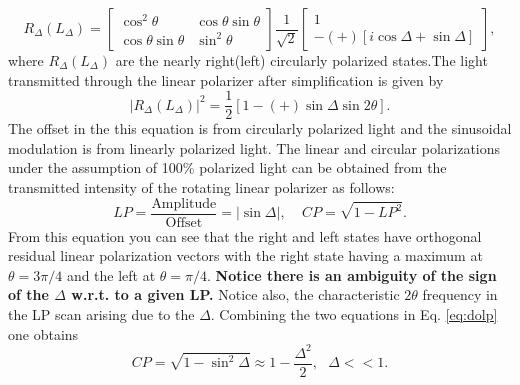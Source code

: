 \documentclass[12pt]{article}
\begin{document}
\begin{equation}
\label{eq:jones}
R_\Delta(L_\Delta)=
\begin{bmatrix}
\cos^2\theta & \cos\theta\sin\theta\\
\cos\theta\sin\theta & \sin^2\theta
\end{bmatrix}
\frac{1}{\sqrt{2}}
\begin{bmatrix}
1\\
-(+)[i\cos\Delta+\sin\Delta]
\end{bmatrix},
\end{equation}
where $R_\Delta(L_\Delta)$ are the nearly right(left) circularly polarized states.The light transmitted through the linear polarizer after simplification is given by
\begin{equation}
\left| R_\Delta(L_\Delta)\right|^2= \frac{1}{2}\left[1-(+)\sin\Delta\sin2\theta\right].
\end{equation}
The offset in the this equation is from circularly polarized light and the sinusoidal modulation is from linearly polarized light. The linear and circular polarizations under the assumption of 100\% polarized light can be obtained from the transmitted intensity of the rotating linear polarizer as follows:
\begin{equation}
\label{eq:dolp}
LP = \frac{\textrm{Amplitude}}{\textrm{Offset}}=\left|\sin\Delta\right|, ~~~~~CP = \sqrt{1-LP^2}.
\end{equation}
From this equation you can see that the right and left states have orthogonal residual linear polarization vectors with the right state having a maximum at $\theta=3\pi/4$ and the left at $\theta=\pi/4$. \textbf{Notice there is an ambiguity of the sign of the $\Delta$ w.r.t. to a given LP.} Notice also, the characteristic $2\theta$ frequency in the LP scan arising due to the $\Delta$. Combining the two equations in Eq. \ref{eq:dolp} one obtains
\begin{equation}
\label{eq:docp}
CP = \sqrt{1-\sin^2\Delta}\approx1-\frac{\Delta^2}{2}, ~~~\Delta<<1.
\end{equation}
\end{document}
